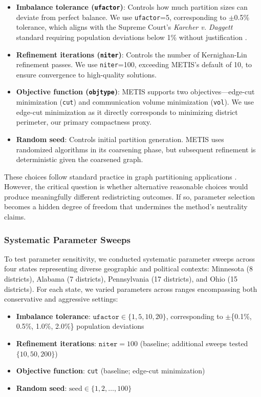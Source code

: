 \begin{itemize}
    \item \textbf{Imbalance tolerance (\texttt{ufactor})}: Controls how much partition sizes can deviate from perfect balance. We use \texttt{ufactor}=5, corresponding to $\pm$0.5\% tolerance, which aligns with the Supreme Court's \textit{Karcher v. Daggett} standard requiring population deviations below 1\% without justification \citep{karcher1983}.

    \item \textbf{Refinement iterations (\texttt{niter})}: Controls the number of Kernighan-Lin refinement passes. We use \texttt{niter}=100, exceeding METIS's default of 10, to ensure convergence to high-quality solutions.

    \item \textbf{Objective function (\texttt{objtype})}: METIS supports two objectives---edge-cut minimization (\texttt{cut}) and communication volume minimization (\texttt{vol}). We use edge-cut minimization as it directly corresponds to minimizing district perimeter, our primary compactness proxy.

    \item \textbf{Random seed}: Controls initial partition generation. METIS uses randomized algorithms in its coarsening phase, but subsequent refinement is deterministic given the coarsened graph.
\end{itemize}

These choices follow standard practice in graph partitioning applications \citep{schloegel2002graph}. However, the critical question is whether alternative reasonable choices would produce meaningfully different redistricting outcomes. If so, parameter selection becomes a hidden degree of freedom that undermines the method's neutrality claims.

\subsubsection{Systematic Parameter Sweeps}
\label{sec:parameter-sweeps}

To test parameter sensitivity, we conducted systematic parameter sweeps across four states representing diverse geographic and political contexts: Minnesota (8 districts), Alabama (7 districts), Pennsylvania (17 districts), and Ohio (15 districts). For each state, we varied parameters across ranges encompassing both conservative and aggressive settings:

\begin{itemize}
    \item \textbf{Imbalance tolerance}: $\texttt{ufactor} \in \{1, 5, 10, 20\}$, corresponding to $\pm$\{0.1\%, 0.5\%, 1.0\%, 2.0\%\} population deviations
    \item \textbf{Refinement iterations}: $\texttt{niter}=100$ (baseline; additional sweeps tested $\{10, 50, 200\}$)
    \item \textbf{Objective function}: \texttt{cut} (baseline; edge-cut minimization)
    \item \textbf{Random seed}: $\text{seed} \in \{1, 2, \ldots, 100\}$
\end{itemize}

